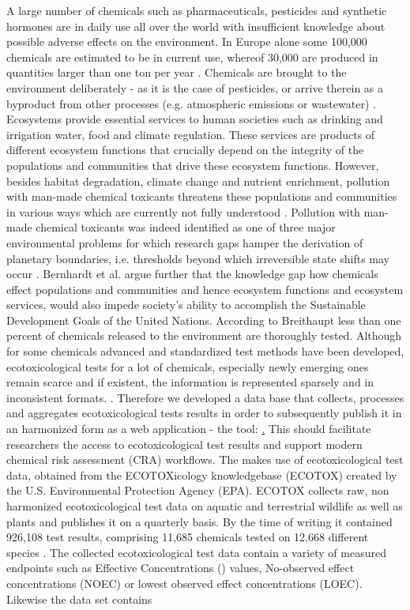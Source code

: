 A large number of chemicals such as pharmaceuticals, pesticides and synthetic hormones are in daily use all over the world with insufficient knowledge about possible adverse effects on the environment. In Europe alone some 100,000 chemicals are estimated to be in current use, whereof 30,000 are produced in quantities larger than one ton per year \citep{breithaupt_costs_2006}. Chemicals are brought to the environment deliberately - as it is the case of pesticides, or arrive therein as a byproduct from other processes (e.g. atmospheric emissions or wastewater) \citep{schwarzenbach_challenge_2006}. Ecosystems provide essential services to human societies such as drinking and irrigation water, food and climate regulation. These services are products of different ecosystem functions that crucially depend on the integrity of the populations and communities that drive these ecosystem functions. However, besides habitat degradation, climate change and nutrient enrichment, pollution with man-made chemical toxicants threatens these populations and communities in various ways which are currently not fully understood \citep{steffen_anthropocene_2007}. Pollution with man-made chemical toxicants was indeed identified as one of three major environmental problems for which research gaps hamper the derivation of planetary boundaries, i.e. thresholds beyond which irreversible state shifts may occur \citep{steffen_anthropocene_2007}. Bernhardt et al. \citet{bernhardt_synthetic_2017} argue further that the knowledge gap how chemicals effect populations and communities and hence ecosystem functions and ecosystem services, would also impede society's ability to accomplish the Sustainable Development Goals of the United Nations. According to Breithaupt \citet{breithaupt_costs_2006} less than one percent of chemicals released to the environment are thoroughly tested. Although for some chemicals advanced and standardized \citep{oecd_oecd_2018} test methods have been developed, ecotoxicological tests for a lot of chemicals, especially newly emerging ones remain scarce and if existent, the information is represented sparsely and in inconsistent formats. \citep{gessner_fostering_2016}. Therefore we developed a data base that collects, processes and aggregates ecotoxicological tests results in order to subsequently publish it in an harmonized form as a web application - the \etoxbase{} tool: \href{http://139.14.20.252:3838/etox-base-shiny/}. This should facilitate researchers the access to ecotoxicological test results and support modern chemical risk assessment (CRA) workflows. The \etoxbase{} makes use of ecotoxicological test data, obtained from the ECOTOXicology knowledgebase (ECOTOX) created by the U.S. Environmental Protection Agency (EPA). ECOTOX collects raw, non harmonized ecotoxicological test data on aquatic and terrestrial wildlife as well as plants and publishes it on a quarterly basis. By the time of writing it contained 926,108 test results, comprising 11,685 chemicals tested on 12,668 different species \citep{elonen_ecotoxicology_2018}. The collected ecotoxicological test data contain a variety of measured endpoints such as Effective Concentrations (\ecfifty{}) values, No-observed effect concentrations (NOEC) or lowest observed effect concentrations (LOEC). Likewise the data set contains 